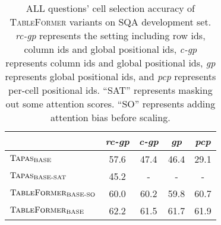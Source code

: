 \documentclass[11pt]{article}
\begin{document}
\begin{table}[t]
\small
\centering
\begin{tabular}{lcccc}
\toprule
                                          & \textit{rc-gp} & \textit{c-gp} & \textit{gp} & \textit{pcp} \\\midrule
$\textsc{Tapas}_{\text{BASE}}$                                & 57.6       & 47.4                           & 46.4                       & 29.1                        \\
$\textsc{Tapas}_{\text{BASE-SAT}}$          & 45.2       & -                              & -                          & -                           \\
$\textsc{TableFormer}_{\text{BASE-SO}}$                & 60.0       & 60.2                           & 59.8                       & 60.7                        \\
$\textsc{TableFormer}_{\text{BASE}}$                          & 62.2       & 61.5                           & 61.7                       & 61.9                        
\\\bottomrule
\end{tabular}
\caption{\label{tab:widgets5}ALL questions' cell selection accuracy of \textsc{TableFormer} variants on SQA development set. \textit{rc-gp} represents the setting including row ids, column ids and global positional ids, \textit{c-gp} represents column ids and global positional ids, \textit{gp} represents global positional ids, and \textit{pcp} represents per-cell positional ids. ``SAT'' represents masking out some attention scores. ``SO'' represents adding attention bias before scaling.}
\end{table}
\end{document}
